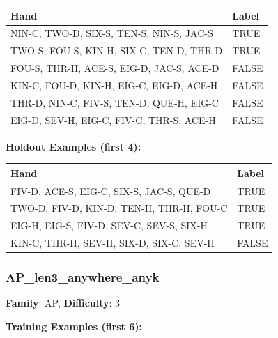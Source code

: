 \documentclass[10pt,a4paper]{article}
\begin{document}
\begin{small}
\begin{tabular}{p{8cm}l}
\toprule
Hand & Label \\
\midrule
NIN-C, TWO-D, SIX-S, TEN-S, NIN-S, JAC-S & \textcolor{positive}{TRUE} \\
TWO-S, FOU-S, KIN-H, SIX-C, TEN-D, THR-D & \textcolor{positive}{TRUE} \\
FOU-S, THR-H, ACE-S, EIG-D, JAC-S, ACE-D & \textcolor{negative}{FALSE} \\
KIN-C, FOU-D, KIN-H, EIG-C, EIG-D, ACE-H & \textcolor{negative}{FALSE} \\
THR-D, NIN-C, FIV-S, TEN-D, QUE-H, EIG-C & \textcolor{negative}{FALSE} \\
EIG-D, SEV-H, EIG-C, FIV-C, THR-S, ACE-H & \textcolor{negative}{FALSE} \\
\bottomrule
\end{tabular}
\end{small}

\textbf{Holdout Examples (first 4):}

\begin{small}
\begin{tabular}{p{8cm}l}
\toprule
Hand & Label \\
\midrule
FIV-D, ACE-S, EIG-C, SIX-S, JAC-S, QUE-D & \textcolor{positive}{TRUE} \\
TWO-D, FIV-D, KIN-D, TEN-H, THR-H, FOU-C & \textcolor{positive}{TRUE} \\
EIG-H, EIG-S, FIV-D, SEV-C, SEV-S, SIX-H & \textcolor{positive}{TRUE} \\
KIN-C, THR-H, SEV-H, SIX-D, SIX-C, SEV-H & \textcolor{negative}{FALSE} \\
\bottomrule
\end{tabular}
\end{small}

\vspace{0.5cm}

\subsubsection{AP\_len3\_anywhere\_anyk}

\textbf{Family}: AP, \textbf{Difficulty}: 3

\textbf{Training Examples (first 6):}
\end{document}
